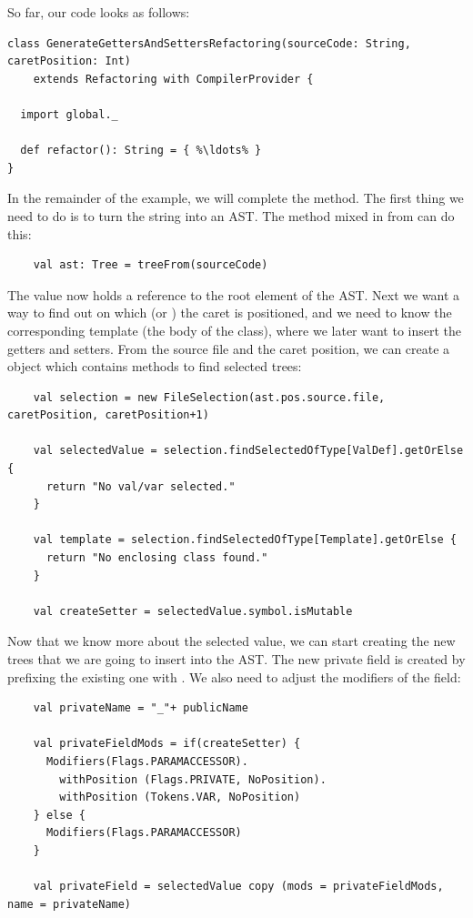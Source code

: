 \documentclass[10pt,a4paper,oneside]{scrreprt}
\begin{document}
So far, our code looks as follows:

\begin{lstlisting}
class GenerateGettersAndSettersRefactoring(sourceCode: String, caretPosition: Int) 
    extends Refactoring with CompilerProvider {
  
  import global._
  
  def refactor(): String = { %\ldots% }
}
\end{lstlisting}

In the remainder of the example, we will complete the  method. The first thing we need to do is to turn the  string into an AST. The  method mixed in from  can do this:

\begin{lstlisting}
    val ast: Tree = treeFrom(sourceCode)
\end{lstlisting}

The  value now holds a reference to the root element of the AST. Next we want a way to find out on which  (or ) the caret is positioned, and we need to know the corresponding template (the body of the class), where we later want to insert the getters and setters. From the source file and the caret position, we can create a  object which contains methods to find selected trees:
    
\begin{lstlisting}
    val selection = new FileSelection(ast.pos.source.file, caretPosition, caretPosition+1)
    
    val selectedValue = selection.findSelectedOfType[ValDef].getOrElse {
      return "No val/var selected."
    }
    
    val template = selection.findSelectedOfType[Template].getOrElse {
      return "No enclosing class found."
    }

    val createSetter = selectedValue.symbol.isMutable
\end{lstlisting}

Now that we know more about the selected value, we can start creating the new trees that we are going to insert into the AST. The new private field is created by prefixing the existing one with \src{\_}. We also need to adjust the modifiers of the field:

\begin{lstlisting}
    val privateName = "_"+ publicName
    
    val privateFieldMods = if(createSetter) {
      Modifiers(Flags.PARAMACCESSOR).
        withPosition (Flags.PRIVATE, NoPosition).
        withPosition (Tokens.VAR, NoPosition)
    } else {
      Modifiers(Flags.PARAMACCESSOR)
    }
      
    val privateField = selectedValue copy (mods = privateFieldMods, name = privateName)
\end{lstlisting}
\end{document}
